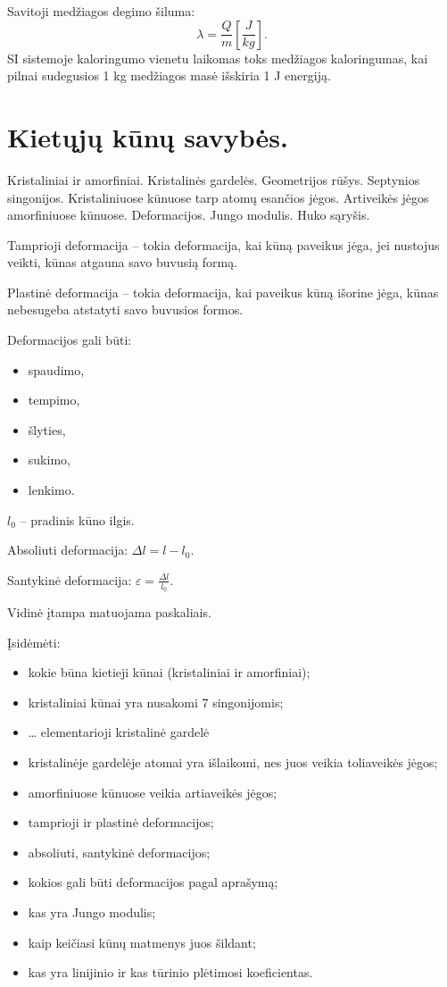 Savitoji medžiagos degimo šiluma:
\begin{equation*}
  \lambda = \frac{Q}{m} \left[ \frac{J}{kg} \right].
\end{equation*}
SI sistemoje kaloringumo vienetu laikomas toks medžiagos kaloringumas,
kai pilnai sudegusios 1 kg medžiagos masė išskiria 1 J energiją.

\section{Kietųjų kūnų savybės.}

Kristaliniai ir amorfiniai. Kristalinės gardelės. Geometrijos rūšys.
Septynios singonijos. Kristaliniuose kūnuose tarp atomų esančios jėgos.
Artiveikės jėgos amorfiniuose kūnuose. Deformacijos. Jungo modulis.
Huko sąryšis.

Tamprioji deformacija – tokia deformacija, kai kūną paveikus jėga, jei
nustojus veikti, kūnas atgauna savo buvusią formą.

Plastinė deformacija – tokia deformacija, kai paveikus kūną išorine jėga,
kūnas nebesugeba atstatyti savo buvusios formos.

Deformacijos gali būti:
\begin{itemize}
  \item spaudimo,
  \item tempimo,
  \item šlyties,
  \item sukimo,
  \item lenkimo.
\end{itemize}

$l_{0}$ – pradinis kūno ilgis.

Absoliuti deformacija: $\Delta l = l - l_{0}$.

Santykinė deformacija: $\varepsilon = \frac{\Delta l}{l_{0}}$.

Vidinė įtampa matuojama paskaliais.

Įsidėmėti:
\begin{itemize}
  \item kokie būna kietieji kūnai (kristaliniai ir amorfiniai);
  \item kristaliniai kūnai yra nusakomi 7 singonijomis;
  \item … elementarioji kristalinė gardelė
  \item kristalinėje gardelėje atomai yra išlaikomi, nes juos veikia
    toliaveikės jėgos;
  \item amorfiniuose kūnuose veikia artiaveikės jėgos;
  \item tamprioji ir plastinė deformacijos;
  \item absoliuti, santykinė deformacijos;
  \item kokios gali būti deformacijos pagal aprašymą;
  \item kas yra Jungo modulis;
  \item kaip keičiasi kūnų matmenys juos šildant;
  \item kas yra linijinio ir kas tūrinio plėtimosi koeficientas.
\end{itemize}

